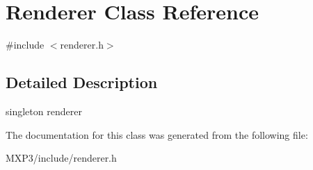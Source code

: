 \hypertarget{class_renderer}{}\section{Renderer Class Reference}
\label{class_renderer}


{\ttfamily \#include $<$renderer.\+h$>$}



\subsection{Detailed Description}
singleton renderer 

The documentation for this class was generated from the following file\+:\begin{DoxyCompactItemize}
\item 
M\+X\+P3/include/renderer.\+h\end{DoxyCompactItemize}
